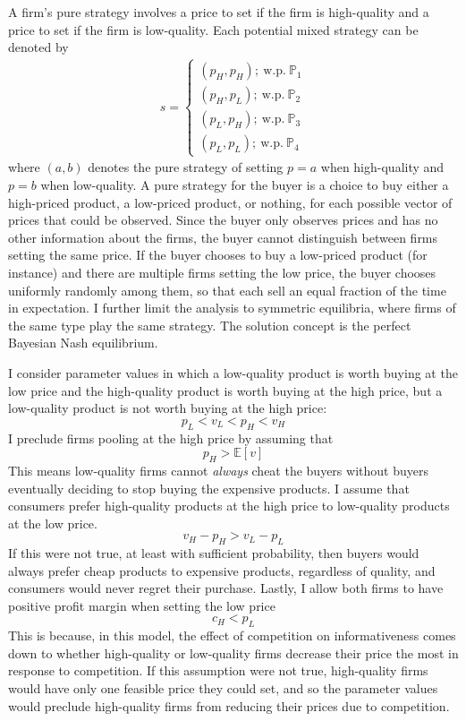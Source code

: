\documentclass[12pt]{article}
\begin{document}


A firm's pure strategy involves a price to set if the firm is high-quality and a price to set if the firm is low-quality. Each potential mixed strategy can be denoted by
\begin{align*}
s = \begin{cases} (p_H,p_H); \ \text{w.p.} \ \mathbb{P}_1 \\ (p_H,p_L); \ \text{w.p.} \ \mathbb{P}_2 \\ (p_L,p_H); \ \text{w.p.} \ \mathbb{P}_3 \\ (p_L,p_L); \ \text{w.p.} \ \mathbb{P}_4 \end{cases}
\end{align*}
where $(a,b)$ denotes the pure strategy of setting $p = a$ when high-quality and $p = b$ when low-quality. A pure strategy for the buyer is a choice to buy either a high-priced product, a low-priced product, or nothing, for each possible vector of prices that could be observed. Since the buyer only observes prices and has no other information about the firms, the buyer cannot distinguish between firms setting the same price. If the buyer chooses to buy a low-priced product (for instance) and there are multiple firms setting the low price, the buyer chooses uniformly randomly among them, so that each sell an equal fraction of the time in expectation. I further limit the analysis to symmetric equilibria, where firms of the same type play the same strategy. The solution concept is the perfect Bayesian Nash equilibrium. 

I consider parameter values in which a low-quality product is worth buying at the low price and the high-quality product is worth buying at the high price, but a low-quality product is not worth buying at the high price:
\[ p_L < v_L < p_H < v_H \]
I preclude firms pooling at the high price by assuming that 
\[ p_H > \mathbb{E}[v] \]
This means low-quality firms cannot \emph{always} cheat the buyers without buyers eventually deciding to stop buying the expensive products. I assume that consumers prefer high-quality products at the high price to low-quality products at the low price. 
\[ v_H - p_H > v_L - p_L \]
If this were not true, at least with sufficient probability, then buyers would always prefer cheap products to expensive products, regardless of quality, and consumers would never regret their purchase. Lastly, I allow both firms to have positive profit margin when setting the low price 
\[ c_H < p_L \]
This is because, in this model, the effect of competition on informativeness comes down to whether high-quality or low-quality firms decrease their price the most in response to competition. If this assumption were not true, high-quality firms would have only one feasible price they could set, and so the parameter values would preclude high-quality firms from reducing their prices due to competition. 
\end{document}
